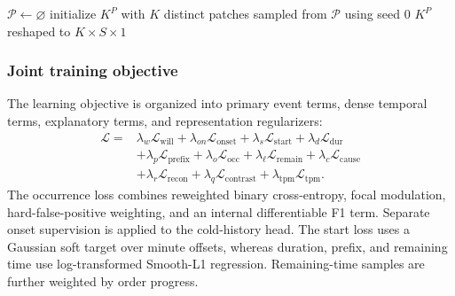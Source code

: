 \documentclass[a4paper,fleqn]{cas-dc}
\begin{document}
\begin{algorithm}[t]
\caption{Training-only short-pattern prototype fitting.}
\label{alg:pattern-bank}
$\mathcal{P}\leftarrow\varnothing$\;
initialize $K^P$ with $K$ distinct patches sampled from $\mathcal{P}$ using seed $0$\;
\Return $K^P$ reshaped to $K\times S\times1$\;
\end{algorithm}

\subsubsection{Joint training objective}

The learning objective is organized into primary event terms, dense temporal terms, explanatory terms, and representation regularizers:
\begin{equation}
\begin{aligned}
\mathcal{L}={}&
\lambda_w\mathcal{L}_{\mathrm{will}}+
\lambda_{on}\mathcal{L}_{\mathrm{onset}}+
\lambda_s\mathcal{L}_{\mathrm{start}}+
\lambda_d\mathcal{L}_{\mathrm{dur}}\\
&+\lambda_p\mathcal{L}_{\mathrm{prefix}}+
\lambda_o\mathcal{L}_{\mathrm{occ}}+
\lambda_{\ell}\mathcal{L}_{\mathrm{remain}}+
\lambda_c\mathcal{L}_{\mathrm{cause}}\\
&+\lambda_r\mathcal{L}_{\mathrm{recon}}+
\lambda_q\mathcal{L}_{\mathrm{contrast}}+
\lambda_{\mathrm{tpm}}\mathcal{L}_{\mathrm{tpm}} .
\end{aligned}
\end{equation}
The occurrence loss combines reweighted binary cross-entropy, focal modulation, hard-false-positive weighting, and an internal differentiable F1 term. Separate onset supervision is applied to the cold-history head. The start loss uses a Gaussian soft target over minute offsets, whereas duration, prefix, and remaining time use log-transformed Smooth-L1 regression. Remaining-time samples are further weighted by order progress.
\end{document}
